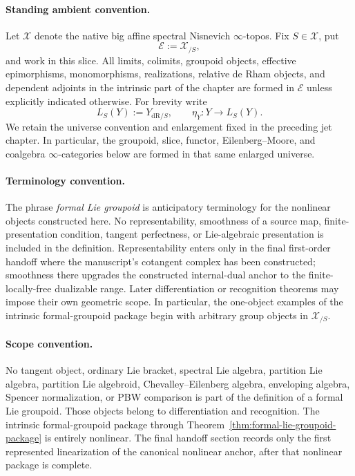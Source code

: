 \paragraph{Standing ambient convention.}
Let $\mathcal X$ denote the native big affine spectral Nisnevich
$\infty$-topos.  Fix $S\in\mathcal X$, put
\[
    \mathcal E:=\mathcal X_{/S},
\]
and work in this slice.  All limits, colimits, groupoid objects, effective
epimorphisms, monomorphisms, realizations, relative de Rham objects, and
dependent adjoints in the intrinsic part of the chapter are formed in
$\mathcal E$ unless explicitly indicated otherwise.  For brevity write
\[
    L_S(Y):=Y_{\mathrm{dR}/S},
    \qquad
    \eta_Y:Y\longrightarrow L_S(Y).
\]
We retain the universe convention and enlargement fixed in the preceding jet
chapter.  In particular, the groupoid, slice, functor, Eilenberg--Moore, and
coalgebra $\infty$-categories below are formed in that same enlarged universe.

\paragraph{Terminology convention.}
The phrase \emph{formal Lie groupoid} is anticipatory terminology for the
nonlinear objects constructed here.  No representability, smoothness of a
source map, finite-presentation condition, tangent perfectness, or
Lie-algebraic presentation is included in the definition.  Representability
enters only in the final first-order handoff where the manuscript's cotangent
complex has been constructed; smoothness there upgrades the constructed
internal-dual anchor to the finite-locally-free dualizable range.  Later
differentiation or recognition theorems may impose their own geometric
scope.  In particular, the one-object examples of the intrinsic
formal-groupoid package begin with arbitrary group objects in
$\mathcal X_{/S}$.

\paragraph{Scope convention.}
No tangent object, ordinary Lie bracket, spectral Lie algebra, partition Lie
algebra, partition Lie algebroid, Chevalley--Eilenberg algebra, enveloping
algebra, Spencer normalization, or PBW comparison is part of the definition
of a formal Lie groupoid.  Those objects belong to differentiation and
recognition.  The intrinsic formal-groupoid package through
Theorem~\ref{thm:formal-lie-groupoid-package} is entirely nonlinear.  The
final handoff section records only the first represented linearization of the
canonical nonlinear anchor, after that nonlinear package is complete.

